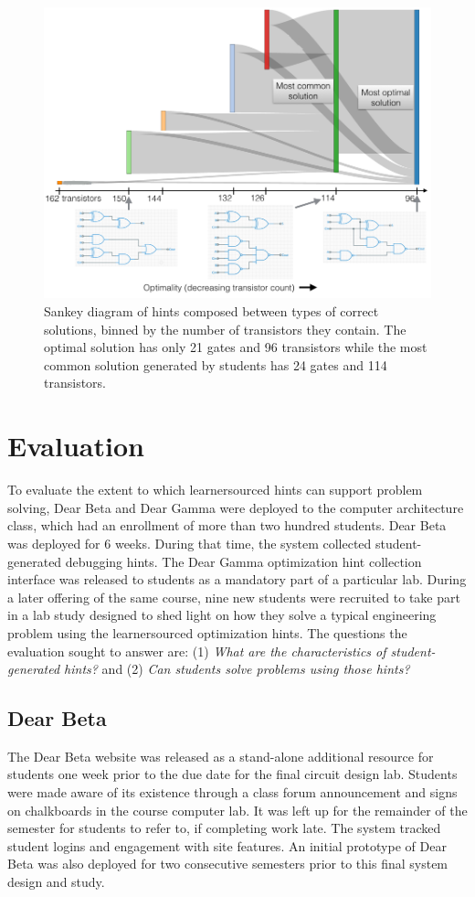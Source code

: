 \begin{figure}
\centering
\includegraphics[width=1.0\columnwidth]{Body/figures/classoverflow/annotated_Sankey_onecolumn.png}
\caption{Sankey diagram of hints composed between types of correct solutions, binned by the number of transistors they contain. The optimal solution has only 21 gates and 96 transistors while the most common solution generated by students has 24 gates and 114 transistors.}
\label{fig:sankey}
\end{figure}


\section{Evaluation}

To evaluate the extent to which learnersourced hints can support problem solving, Dear Beta and Dear Gamma were deployed to the computer architecture class, which had an enrollment of more than two hundred students. Dear Beta was deployed for 6 weeks. During that time, the system collected student-generated debugging hints. The Dear Gamma optimization hint collection interface was released to students as a mandatory part of a particular lab. During a later offering of the same course, nine new students were recruited to take part in a lab study designed to shed light on how they solve a typical engineering problem using the learnersourced optimization hints. The questions the evaluation sought to answer are: (1) {\it What are the characteristics of student-generated hints?} and (2) {\it Can students solve problems using those hints?}

\subsection{Dear Beta}
The Dear Beta website was released as a stand-alone additional resource for students one week prior to the due date for the final circuit design lab. Students were made aware of its existence through a class forum announcement and signs on chalkboards in the course computer lab. It was left up for the remainder of the semester for students to refer to, if completing work late. The system tracked student logins and engagement with site features. An initial prototype of Dear Beta was also deployed for two consecutive semesters prior to this final system design and study.

